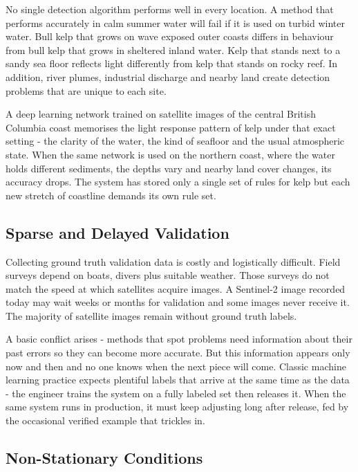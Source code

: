 \documentclass[11pt,a4paper]{article}
\begin{document}
No single detection algorithm performs well in every location. A method that performs accurately in calm summer water will fail if it is used on turbid winter water. Bull kelp that grows on wave exposed outer coasts differs in behaviour from bull kelp that grows in sheltered inland water. Kelp that stands next to a sandy sea floor reflects light differently from kelp that stands on rocky reef. In addition, river plumes, industrial discharge and nearby land create detection problems that are unique to each site.

A deep learning network trained on satellite images of the central British Columbia coast memorises the light response pattern of kelp under that exact setting - the clarity of the water, the kind of seafloor and the usual atmospheric state. When the same network is used on the northern coast, where the water holds different sediments, the depths vary and nearby land cover changes, its accuracy drops. The system has stored only a single set of rules for kelp but each new stretch of coastline demands its own rule set.

\subsection{Sparse and Delayed Validation}

Collecting ground truth validation data is costly and logistically difficult. Field surveys depend on boats, divers plus suitable weather. Those surveys do not match the speed at which satellites acquire images. A Sentinel-2 image recorded today may wait weeks or months for validation and some images never receive it. The majority of satellite images remain without ground truth labels.

A basic conflict arises - methods that spot problems need information about their past errors so they can become more accurate. But this information appears only now and then and no one knows when the next piece will come. Classic machine learning practice expects plentiful labels that arrive at the same time as the data - the engineer trains the system on a fully labeled set then releases it. When the same system runs in production, it must keep adjusting long after release, fed by the occasional verified example that trickles in.

\subsection{Non-Stationary Conditions}
\end{document}
